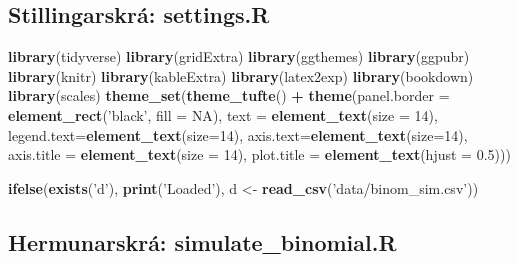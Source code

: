 \documentclass[10pt,]{article}
\newenvironment{Shaded}{\begin{snugshade}}{\end{snugshade}}
\newcommand{\DataTypeTok}[1]{\textcolor[rgb]{0.13,0.29,0.53}{#1}}
\newcommand{\DecValTok}[1]{\textcolor[rgb]{0.00,0.00,0.81}{#1}}
\newcommand{\FloatTok}[1]{\textcolor[rgb]{0.00,0.00,0.81}{#1}}
\newcommand{\KeywordTok}[1]{\textcolor[rgb]{0.13,0.29,0.53}{\textbf{#1}}}
\newcommand{\NormalTok}[1]{#1}
\newcommand{\OperatorTok}[1]{\textcolor[rgb]{0.81,0.36,0.00}{\textbf{#1}}}
\newcommand{\OtherTok}[1]{\textcolor[rgb]{0.56,0.35,0.01}{#1}}
\newcommand{\StringTok}[1]{\textcolor[rgb]{0.31,0.60,0.02}{#1}}
\begin{document}
\hypertarget{stillingarskruxe1-settings.r}{%
\subsection{Stillingarskrá: settings.R}\label{stillingarskruxe1-settings.r}}

\begin{Shaded}
\begin{Highlighting}[]
\KeywordTok{library}\NormalTok{(tidyverse)}
\KeywordTok{library}\NormalTok{(gridExtra)}
\KeywordTok{library}\NormalTok{(ggthemes)}
\KeywordTok{library}\NormalTok{(ggpubr)}
\KeywordTok{library}\NormalTok{(knitr)}
\KeywordTok{library}\NormalTok{(kableExtra)}
\KeywordTok{library}\NormalTok{(latex2exp)}
\KeywordTok{library}\NormalTok{(bookdown)}
\KeywordTok{library}\NormalTok{(scales)}
\KeywordTok{theme_set}\NormalTok{(}\KeywordTok{theme_tufte}\NormalTok{() }\OperatorTok{+}
\StringTok{            }\KeywordTok{theme}\NormalTok{(}\DataTypeTok{panel.border =} \KeywordTok{element_rect}\NormalTok{(}\StringTok{'black'}\NormalTok{, }\DataTypeTok{fill =} \OtherTok{NA}\NormalTok{),}
                  \DataTypeTok{text =} \KeywordTok{element_text}\NormalTok{(}\DataTypeTok{size =} \DecValTok{14}\NormalTok{),}
                  \DataTypeTok{legend.text=}\KeywordTok{element_text}\NormalTok{(}\DataTypeTok{size=}\DecValTok{14}\NormalTok{),}
                  \DataTypeTok{axis.text=}\KeywordTok{element_text}\NormalTok{(}\DataTypeTok{size=}\DecValTok{14}\NormalTok{),}
                  \DataTypeTok{axis.title =} \KeywordTok{element_text}\NormalTok{(}\DataTypeTok{size =} \DecValTok{14}\NormalTok{),}
                  \DataTypeTok{plot.title =} \KeywordTok{element_text}\NormalTok{(}\DataTypeTok{hjust =} \FloatTok{0.5}\NormalTok{)))}

\KeywordTok{ifelse}\NormalTok{(}\KeywordTok{exists}\NormalTok{(}\StringTok{'d'}\NormalTok{), }\KeywordTok{print}\NormalTok{(}\StringTok{'Loaded'}\NormalTok{), d <-}\StringTok{ }\KeywordTok{read_csv}\NormalTok{(}\StringTok{'data/binom_sim.csv'}\NormalTok{))}
\end{Highlighting}
\end{Shaded}

\hypertarget{hermunarskruxe1-simulate_binomial.r}{%
\subsection{Hermunarskrá: simulate\_binomial.R}\label{hermunarskruxe1-simulate_binomial.r}}
\end{document}
